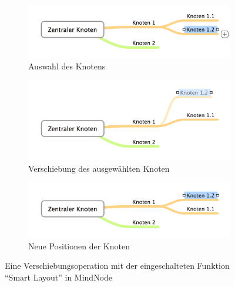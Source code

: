 
\begin{figure}[hbt]
    \newcommand{\subfigurewidth}{\textwidth}
    \newcommand{\graphicswidth}{0.8\linewidth}
    \begin{subfigure}{\subfigurewidth}
        \centering
        \includegraphics[width=\graphicswidth]{resources/mindnode-smart-layout-a}
        \caption{Auswahl des Knotens}
        \label{fig:mindnode-smart-layout-a}
    \end{subfigure}
    \begin{subfigure}{\subfigurewidth}
        \centering
        \includegraphics[width=\graphicswidth]{resources/mindnode-smart-layout-b}
        \caption{Verschiebung des ausgewählten Knoten}
        \label{fig:mindnode-smart-layout-b}
    \end{subfigure}
    \begin{subfigure}{\subfigurewidth}
        \centering
        \includegraphics[width=\graphicswidth]{resources/mindnode-smart-layout-c}
        \caption{Neue Positionen der Knoten}
        \label{fig:mindnode-smart-layout-c}
    \end{subfigure}
    \caption{Eine Verschiebungsoperation mit der eingeschalteten Funktion \enquote{Smart Layout} in MindNode}
    \label{fig:mindnode-smart-layout}
\end{figure}

